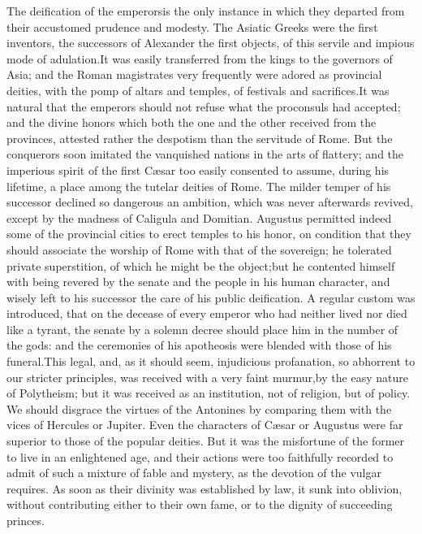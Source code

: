 The deification of the emperors\footnotemark[21] is the only instance in which
they departed from their accustomed prudence and modesty. The
Asiatic Greeks were the first inventors, the successors of
Alexander the first objects, of this servile and impious mode of
adulation.\footnotemark[211] It was easily transferred from the kings to the
governors of Asia; and the Roman magistrates very frequently were
adored as provincial deities, with the pomp of altars and
temples, of festivals and sacrifices.\footnotemark[22] It was natural that the
emperors should not refuse what the proconsuls had accepted; and
the divine honors which both the one and the other received from
the provinces, attested rather the despotism than the servitude
of Rome. But the conquerors soon imitated the vanquished nations
in the arts of flattery; and the imperious spirit of the first
Cæsar too easily consented to assume, during his lifetime, a
place among the tutelar deities of Rome. The milder temper of his
successor declined so dangerous an ambition, which was never
afterwards revived, except by the madness of Caligula and
Domitian. Augustus permitted indeed some of the provincial cities
to erect temples to his honor, on condition that they should
associate the worship of Rome with that of the sovereign; he
tolerated private superstition, of which he might be the object;\footnotemark[23]
but he contented himself with being revered by the senate and
the people in his human character, and wisely left to his
successor the care of his public deification. A regular custom
was introduced, that on the decease of every emperor who had
neither lived nor died like a tyrant, the senate by a solemn
decree should place him in the number of the gods: and the
ceremonies of his apotheosis were blended with those of his
funeral.\footnotemark[231] This legal, and, as it should seem, injudicious
profanation, so abhorrent to our stricter principles, was
received with a very faint murmur,\footnotemark[24] by the easy nature of
Polytheism; but it was received as an institution, not of
religion, but of policy. We should disgrace the virtues of the
Antonines by comparing them with the vices of Hercules or
Jupiter. Even the characters of Cæsar or Augustus were far
superior to those of the popular deities. But it was the
misfortune of the former to live in an enlightened age, and their
actions were too faithfully recorded to admit of such a mixture
of fable and mystery, as the devotion of the vulgar requires. As
soon as their divinity was established by law, it sunk into
oblivion, without contributing either to their own fame, or to
the dignity of succeeding princes.

